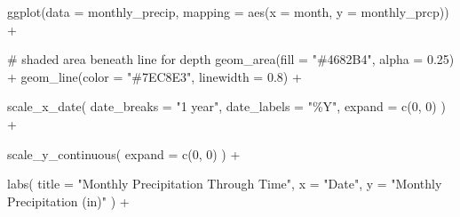 \documentclass[
  letterpaper,
  DIV=11,
  numbers=noendperiod]{scrartcl}
\newenvironment{Shaded}{\begin{snugshade}}{\end{snugshade}}
\newcommand{\AttributeTok}[1]{\textcolor[rgb]{0.40,0.45,0.13}{#1}}
\newcommand{\CommentTok}[1]{\textcolor[rgb]{0.37,0.37,0.37}{#1}}
\newcommand{\DecValTok}[1]{\textcolor[rgb]{0.68,0.00,0.00}{#1}}
\newcommand{\FloatTok}[1]{\textcolor[rgb]{0.68,0.00,0.00}{#1}}
\newcommand{\FunctionTok}[1]{\textcolor[rgb]{0.28,0.35,0.67}{#1}}
\newcommand{\NormalTok}[1]{\textcolor[rgb]{0.00,0.23,0.31}{#1}}
\newcommand{\SpecialCharTok}[1]{\textcolor[rgb]{0.37,0.37,0.37}{#1}}
\newcommand{\StringTok}[1]{\textcolor[rgb]{0.13,0.47,0.30}{#1}}
\begin{document}
\begin{Shaded}
\begin{Highlighting}[]
\FunctionTok{ggplot}\NormalTok{(}\AttributeTok{data =}\NormalTok{ monthly\_precip,}
       \AttributeTok{mapping =} \FunctionTok{aes}\NormalTok{(}\AttributeTok{x =}\NormalTok{ month,}
                     \AttributeTok{y =}\NormalTok{ monthly\_prcp)) }\SpecialCharTok{+}

  \CommentTok{\# shaded area beneath line for depth}
  \FunctionTok{geom\_area}\NormalTok{(}\AttributeTok{fill =} \StringTok{"\#4682B4"}\NormalTok{, }\AttributeTok{alpha =} \FloatTok{0.25}\NormalTok{) }\SpecialCharTok{+}
  \FunctionTok{geom\_line}\NormalTok{(}\AttributeTok{color =} \StringTok{"\#7EC8E3"}\NormalTok{, }\AttributeTok{linewidth =} \FloatTok{0.8}\NormalTok{) }\SpecialCharTok{+}

  \FunctionTok{scale\_x\_date}\NormalTok{(}
    \AttributeTok{date\_breaks =} \StringTok{"1 year"}\NormalTok{,}
    \AttributeTok{date\_labels =} \StringTok{"\%Y"}\NormalTok{,}
    \AttributeTok{expand =} \FunctionTok{c}\NormalTok{(}\DecValTok{0}\NormalTok{, }\DecValTok{0}\NormalTok{)}
\NormalTok{  ) }\SpecialCharTok{+}

  \FunctionTok{scale\_y\_continuous}\NormalTok{(}
    \AttributeTok{expand =} \FunctionTok{c}\NormalTok{(}\DecValTok{0}\NormalTok{, }\DecValTok{0}\NormalTok{)}
\NormalTok{  ) }\SpecialCharTok{+}

  \FunctionTok{labs}\NormalTok{(}
    \AttributeTok{title =} \StringTok{"Monthly Precipitation Through Time"}\NormalTok{,}
    \AttributeTok{x     =} \StringTok{"Date"}\NormalTok{,}
    \AttributeTok{y     =} \StringTok{"Monthly Precipitation (in)"}
\NormalTok{  ) }\SpecialCharTok{+}


\end{Highlighting}
\end{Shaded}
\end{document}
